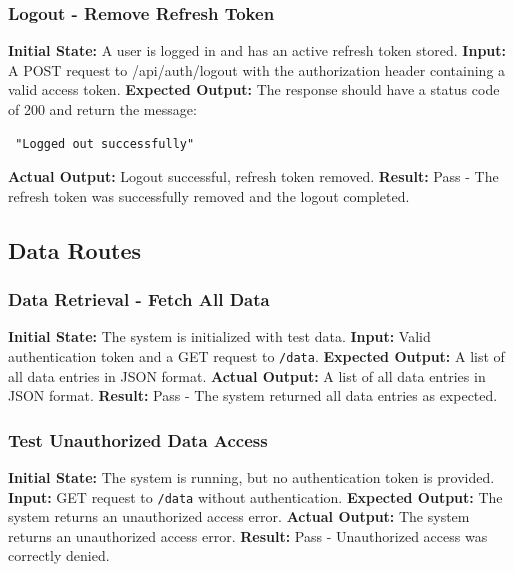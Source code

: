 \documentclass[12pt, titlepage]{article}
\begin{document}
\subsubsection{Logout - Remove Refresh Token} \textbf{Initial State:} A user is logged in and has an active refresh token stored.\newline
\textbf{Input:} A POST request to /api/auth/logout with the authorization header containing a valid access token.\newline
\textbf{Expected Output:} The response should have a status code of 200 and return the message:
\begin{verbatim} "Logged out successfully" \end{verbatim}
\textbf{Actual Output:} Logout successful, refresh token removed.\newline
\textbf{Result:} Pass - The refresh token was successfully removed and the logout completed.

\subsection{Data Routes} \subsubsection{Data Retrieval - Fetch All Data} \textbf{Initial State:} The system is initialized with test data.\newline
\textbf{Input:} Valid authentication token and a GET request to \texttt{/data}.\newline
\textbf{Expected Output:} A list of all data entries in JSON format.\newline
\textbf{Actual Output:} A list of all data entries in JSON format.\newline
\textbf{Result:} Pass - The system returned all data entries as expected.

\subsubsection{Test Unauthorized Data Access} \textbf{Initial State:} The system is running, but no authentication token is provided.\newline
\textbf{Input:} GET request to \texttt{/data} without authentication.\newline
\textbf{Expected Output:} The system returns an unauthorized access error.\newline
\textbf{Actual Output:} The system returns an unauthorized access error.\newline
\textbf{Result:} Pass - Unauthorized access was correctly denied.
\end{document}
